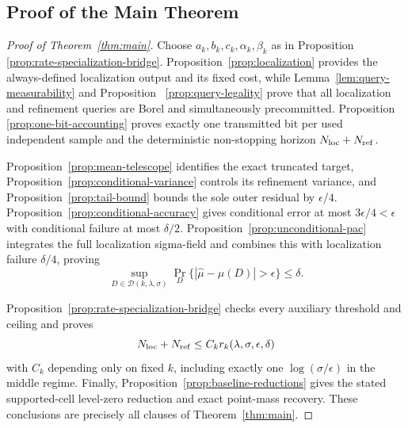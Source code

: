 \subsection{Proof of the Main Theorem}

\begin{proof}[Proof of Theorem~\ref{thm:main}]
Choose $a_k,b_k,c_k,\alpha_k,\beta_k$ as in Proposition~
\ref{prop:rate-specialization-bridge}.  Proposition~\ref{prop:localization}
provides the always-defined localization output and its fixed cost, while
Lemma~\ref{lem:query-measurability} and Proposition~
\ref{prop:query-legality} prove that all localization and refinement queries
are Borel and simultaneously precommitted.  Proposition~
\ref{prop:one-bit-accounting} proves exactly one transmitted bit per used
independent sample and the deterministic non-stopping horizon
$N_{\rm loc}+N_{\rm ref}$.

Proposition~\ref{prop:mean-telescope} identifies the exact truncated target,
Proposition~\ref{prop:conditional-variance} controls its refinement variance,
and Proposition~\ref{prop:tail-bound} bounds the sole outer residual by
$\epsilon/4$.  Proposition~\ref{prop:conditional-accuracy} gives conditional
error at most $3\epsilon/4<\epsilon$ with conditional failure at most
$\delta/2$.  Proposition~\ref{prop:unconditional-pac} integrates the full
localization sigma-field and combines this with localization failure
$\delta/4$, proving
\[
 \sup_{D\in\mathcal D(k,\lambda,\sigma)}
 \Pr_D\{|\widehat\mu-\mu(D)|>\epsilon\}\leq\delta.
\]

Proposition~\ref{prop:rate-specialization-bridge} checks every auxiliary
threshold and ceiling and proves
\[
 N_{\rm loc}+N_{\rm ref}
 \leq C_kr_k(\lambda,\sigma,\epsilon,\delta)
\]
with $C_k$ depending only on fixed $k$, including exactly one
$\log(\sigma/\epsilon)$ in the middle regime.  Finally,
Proposition~\ref{prop:baseline-reductions} gives the stated supported-cell
level-zero reduction and exact point-mass recovery.  These conclusions are
precisely all clauses of Theorem~\ref{thm:main}.
\end{proof}
